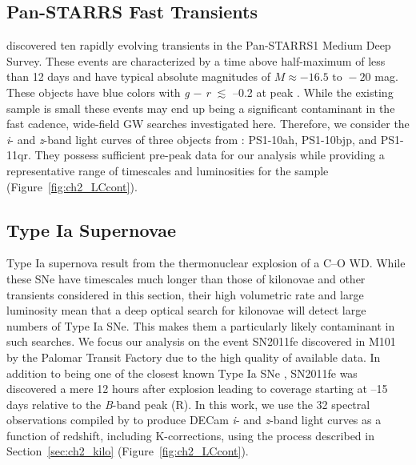 \subsection{Pan-STARRS Fast Transients}
\label{sec:ch2_PSFast}
\citet{Drout+14} discovered ten rapidly evolving transients in the Pan-STARRS1 Medium Deep Survey. These events are characterized by a time above half-maximum of less than 12 days and have typical absolute magnitudes of $M \approx -16.5 \text{ to } -20$ mag. These objects have blue colors with {\em g} $-$ {\em r} $\lesssim$ --0.2 at peak \citep{Drout+14}. While the existing sample is small these events may end up being a significant contaminant in the fast cadence, wide-field GW searches investigated here. Therefore, we consider the {\em i}- and {\em z}-band light curves of three objects from \citet{Drout+14}: PS1-10ah, PS1-10bjp, and PS1-11qr. They possess sufficient pre-peak data for our analysis while providing a representative range of timescales and luminosities for the sample (Figure~\ref{fig:ch2_LCcont}).

\subsection{Type Ia Supernovae}
\label{sec:ch2_typeIa}
Type Ia supernova result from the thermonuclear explosion of a C--O WD. While these SNe have timescales much longer than those of kilonovae and other transients considered in this section, their high volumetric rate and large luminosity mean that a deep optical search for kilonovae will detect large numbers of Type Ia SNe. This makes them a particularly likely contaminant in such searches. We focus our analysis on the event SN2011fe discovered in M101 by the Palomar Transit Factory \citep{Nugent+11a} due to the high quality of available data. In addition to being one of the closest known Type Ia SNe \citep[$\mu = 29.04\pm0.19$,][]{ShappeeStanek11}, SN2011fe was discovered a mere 12 hours after explosion \citep{Nugent+11b} leading to coverage starting at --15 days relative to the {\em B}-band peak (R). In this work, we use the 32 spectral observations compiled by \citet{Pereira+13} to produce DECam {\em i}- and {\em z}-band light curves as a function of redshift, including K-corrections, using the process described in Section~\ref{sec:ch2_kilo} (Figure~\ref{fig:ch2_LCcont}).

